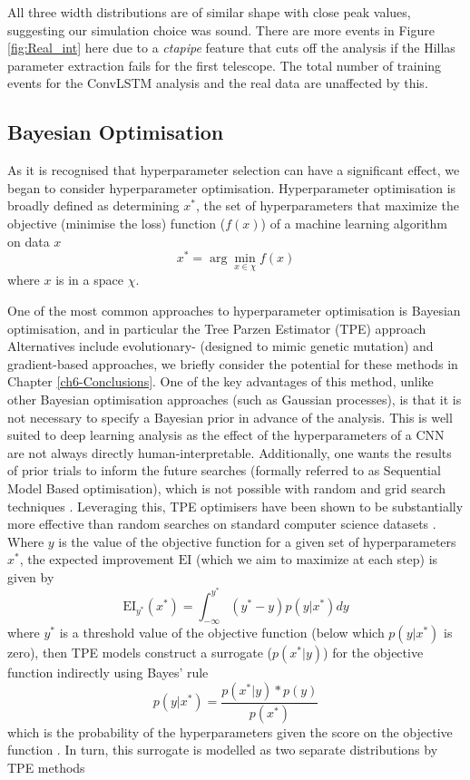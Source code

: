 All three width distributions are of similar shape with close peak values, suggesting our simulation choice was sound. There are more events in Figure \ref{fig:Real_int} here due to a \textit{ctapipe} feature that cuts off the analysis if the Hillas parameter extraction fails for the first telescope. The total number of training events for the ConvLSTM analysis and the real data are unaffected by this.

\subsection{Bayesian Optimisation}
As it is recognised that hyperparameter selection can have a significant effect, we began to consider hyperparameter optimisation. Hyperparameter optimisation is broadly defined as determining $x^*$, the set of hyperparameters that maximize the objective (minimise the loss) function ($f(x)$) of a machine learning algorithm on  data $x$ \begin{equation}
    x^*=\arg \min_{x \in \chi} f(x)
\end{equation}
where $x$ is in a space $\chi$.

One of the most common approaches to hyperparameter optimisation is Bayesian optimisation, and in particular the Tree Parzen Estimator (TPE) approach \cite{bergestra}\cite{tdshyper} Alternatives include evolutionary- (designed to mimic genetic mutation) and gradient-based approaches, we briefly consider the potential for these methods in Chapter \ref{ch6-Conclusions}. One of the key advantages of this method, unlike other Bayesian optimisation approaches (such as Gaussian processes), is that it is not necessary to specify a Bayesian prior in advance of the analysis. This is well suited to deep learning analysis as the effect of the hyperparameters of a CNN are not always directly human-interpretable. Additionally, one wants the results of prior trials to inform the future searches (formally referred to as Sequential Model Based optimisation), which is not possible with random and grid search techniques \cite{tdshyper}. Leveraging this, TPE optimisers have been shown to be substantially more effective than random searches on standard computer science datasets \cite{bergestra}. Where $y$ is the value of the objective function for a given set of hyperparameters $x^*$, the expected improvement $\textrm{EI}$ (which we aim to maximize at each step) is given by
\begin{equation}
    \textrm{EI}_{y^*}(x^*)=\int_{-\infty}^{y^*}(y^*-y)p(y|x^*)dy
\end{equation}
where $y^*$ is a threshold value of the objective function (below which $p(y|x^*)$ is zero), then TPE models construct a surrogate ($p(x^*|y)$) for the objective function indirectly using Bayes' rule
\begin{equation}
    p(y|x^*)=\frac{p(x^*|y)*p(y)}{p(x^*)}
\end{equation}
which is the probability of the hyperparameters given the score on the objective function \cite{tdshyper}. In turn, this surrogate is modelled as two separate distributions by TPE methods

